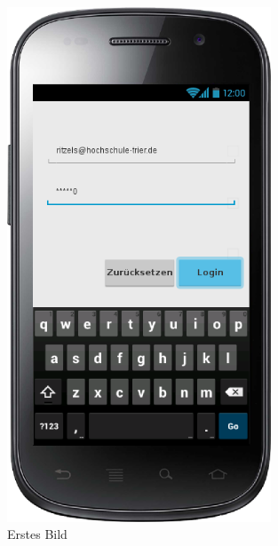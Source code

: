 \begin{figure}[htbp] 
  \centering
     \includegraphics[width=0.7\textwidth]{anhang/mockups/loginerror.png}
  \caption{Erstes Bild}
  \label{fig:Bild1}
\end{figure}

